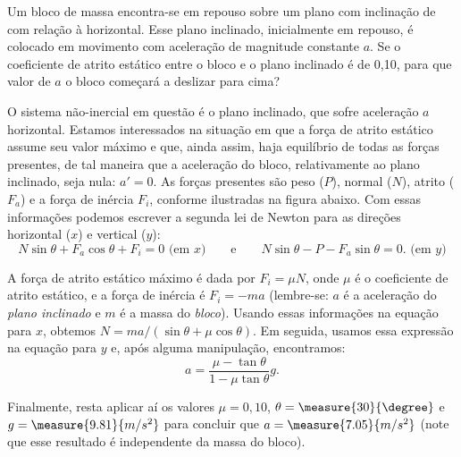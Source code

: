 \begin{question}
    Um bloco de massa  encontra-se em repouso sobre um plano com inclinação de  com relação à horizontal.
    Esse plano inclinado, inicialmente em repouso, é colocado em movimento com aceleração de magnitude constante $a$.
    Se o coeficiente de atrito estático entre o bloco e o plano inclinado é de 0,10, para que valor de $a$ o bloco começará a deslizar para cima?


    \begin{answer}
    \end{answer}

    \begin{solution}
      O sistema não-inercial em questão é o plano inclinado, que sofre aceleração $a$ horizontal.
      Estamos interessados na situação em que a força de atrito estático assume seu valor máximo e que, ainda assim, haja equilíbrio de todas as forças presentes, de tal maneira que a aceleração do bloco, relativamente ao plano inclinado, seja nula: $a' = 0$.
      As forças presentes são peso ($P$), normal ($N$), atrito ($F_a$) e a força de inércia $F_i$, conforme ilustradas na figura abaixo.
      Com essas informações podemos escrever a segunda lei de Newton para as direções horizontal ($x$) e vertical ($y$):
      \begin{equation*}
        N \sin\theta + F_a \cos\theta + F_i = 0
        \text{ (em $x$)}
        \qquad\text{e}\qquad
        N \sin\theta - P - F_a \sin\theta = 0.
        \text{ (em $y$)}
      \end{equation*}


      A força de atrito estático máximo é dada por $F_i = \mu N$, onde $\mu$ é o coeficiente de atrito estático, e a força de inércia é $F_i = -ma$ (lembre-se: $a$ é a aceleração do \emph{plano inclinado} e $m$ é a massa do \emph{bloco}).
      Usando essas informações na equação para $x$, obtemos $N = ma/(\sin\theta + \mu \cos\theta)$.
      Em seguida, usamos essa expressão na equação para $y$ e, após alguma manipulação, encontramos:
      \begin{equation*}
        a = \frac{\mu - \tan\theta}{1 - \mu \tan\theta}g.
      \end{equation*}

      Finalmente, resta aplicar aí os valores $\mu = 0,10$, $\theta = \measure{30}{\degree}$ e $g = \measure{9.81}{m/s^2}$ para concluir que $a = \measure{7.05}{m/s^2}$ (note que esse resultado é independente da massa do bloco).
    \end{solution}
\end{question}